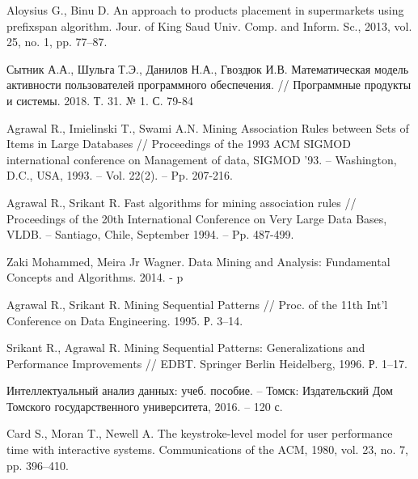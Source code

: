 \begin{thebibliography}{1}
	Aloysius G., Binu D.
	An approach to products placement in supermarkets using prefixspan algorithm.
	Jour. of King Saud Univ. Comp. and Inform. Sc., 2013, vol. 25, no. 1, pp. 77–87.
	
	Сытник А.А., Шульга Т.Э., Данилов Н.А., Гвоздюк И.В.
	Математическая модель активности пользователей программного обеспечения.
	// Программные продукты и системы. 2018. Т. 31. № 1. С. 79-84 
	
	Agrawal R., Imielinski T., Swami A.N.
	Mining Association Rules between Sets of Items in Large Databases
	// Proceedings of the 1993 ACM SIGMOD international conference on Management of data, SIGMOD '93. – Washington, D.C., USA, 1993. – Vol. 22(2). – Pp. 207-216.
	
	Agrawal R., Srikant R.
	Fast algorithms for mining association rules
	// Proceedings of the 20th International Conference on Very Large Data Bases, VLDB. – Santiago, Chile, September 1994. – Pp. 487-499.
	
	Zaki Mohammed, Meira Jr Wagner. Data Mining and Analysis: Fundamental Concepts and Algorithms. 2014. - p  
	
	Agrawal R., Srikant R. Mining Sequential Patterns // Proc. of the 11th Int’l
	Conference on Data Engineering. 1995. Р. 3–14.
	
	Srikant R., Agrawal R. Mining Sequential Patterns: Generalizations and
	Performance Improvements // EDBT. Springer Berlin Heidelberg, 1996.
	Р. 1–17.
	
	Интеллектуальный анализ данных: учеб. пособие. –
	Томск: Издательский Дом Томского государственного
	университета, 2016. – 120 с.
	
	Card S., Moran T., Newell A.
	The keystroke-level model for user performance time with interactive systems.
	Communications of the ACM, 1980, vol. 23, no. 7, pp. 396–410.
	
	
\end{thebibliography}
